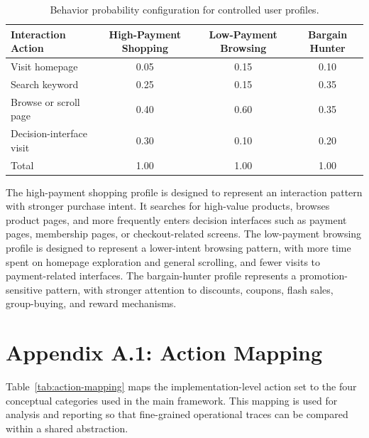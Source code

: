 \begin{table}[htbp]
    \centering
    \caption{Behavior probability configuration for controlled user profiles.}
    \label{tab:profile-behavior-probabilities-appendix}
    \begin{tabular}{lccc}
        \toprule
        \textbf{Interaction Action} & 
        \textbf{High-Payment Shopping} & 
        \textbf{Low-Payment Browsing} & 
        \textbf{Bargain Hunter} \\
        \midrule
        Visit homepage & 0.05 & 0.15 & 0.10 \\
        Search keyword & 0.25 & 0.15 & 0.35 \\
        Browse or scroll page & 0.40 & 0.60 & 0.35 \\
        Decision-interface visit & 0.30 & 0.10 & 0.20 \\
        \midrule
        Total & 1.00 & 1.00 & 1.00 \\
        \bottomrule
    \end{tabular}
\end{table}

The high-payment shopping profile is designed to represent an interaction pattern with stronger purchase intent. It searches for high-value products, browses product pages, and more frequently enters decision interfaces such as payment pages, membership pages, or checkout-related screens. The low-payment browsing profile is designed to represent a lower-intent browsing pattern, with more time spent on homepage exploration and general scrolling, and fewer visits to payment-related interfaces. The bargain-hunter profile represents a promotion-sensitive pattern, with stronger attention to discounts, coupons, flash sales, group-buying, and reward mechanisms.

\section{Appendix A.1: Action Mapping}
\label{app:action-mapping}

Table~\ref{tab:action-mapping} maps the implementation-level action set to the four conceptual categories used in the main framework. This mapping is used for analysis and reporting so that fine-grained operational traces can be compared within a shared abstraction.

